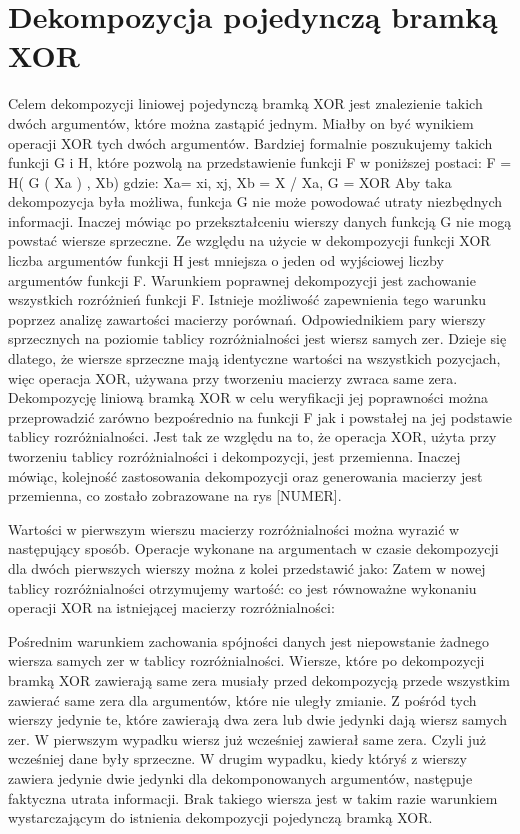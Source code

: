 \section{Dekompozycja pojedynczą bramką XOR}

Celem dekompozycji liniowej pojedynczą bramką XOR jest znalezienie takich dwóch argumentów, które można zastąpić jednym.
Miałby on być wynikiem operacji XOR tych dwóch argumentów.
Bardziej formalnie poszukujemy takich funkcji G i H, które pozwolą na przedstawienie funkcji F w poniższej postaci:
F = H( G ( Xa ) , Xb)
gdzie: Xa= {xi, xj}, Xb = X / Xa, G = XOR
Aby taka dekompozycja była możliwa, funkcja G nie może powodować utraty niezbędnych informacji.
Inaczej mówiąc po przekształceniu wierszy danych funkcją G nie mogą powstać wiersze sprzeczne.
Ze względu na użycie w dekompozycji funkcji XOR liczba argumentów funkcji H jest mniejsza o jeden od wyjściowej liczby argumentów funkcji F.
	Warunkiem poprawnej dekompozycji jest zachowanie wszystkich rozróżnień funkcji F.
Istnieje możliwość zapewnienia tego warunku poprzez analizę zawartości macierzy porównań.
Odpowiednikiem pary wierszy sprzecznych na poziomie tablicy rozróżnialności jest wiersz samych zer.
Dzieje się dlatego, że wiersze sprzeczne mają identyczne wartości na wszystkich pozycjach, więc operacja XOR, używana przy tworzeniu macierzy zwraca same zera.
	Dekompozycję liniową bramką XOR w celu weryfikacji jej poprawności można przeprowadzić zarówno bezpośrednio na funkcji F jak i powstałej na jej podstawie tablicy rozróżnialności.
Jest tak ze względu na to, że operacja XOR, użyta przy tworzeniu tablicy rozróżnialności i dekompozycji, jest przemienna.
Inaczej mówiąc, kolejność zastosowania dekompozycji oraz generowania macierzy jest przemienna, co zostało zobrazowane na rys [NUMER].



Wartości w pierwszym wierszu macierzy rozróżnialności można wyrazić w następujący sposób.
Operacje wykonane na argumentach w czasie dekompozycji dla dwóch pierwszych wierszy można z kolei przedstawić jako:
Zatem w nowej tablicy rozróżnialności otrzymujemy wartość:
 co jest równoważne wykonaniu operacji XOR na istniejącej macierzy rozróżnialności:

Pośrednim warunkiem zachowania spójności danych jest niepowstanie żadnego wiersza samych zer w tablicy rozróżnialności.
Wiersze, które po dekompozycji bramką XOR zawierają same zera musiały przed dekompozycją przede wszystkim zawierać same zera dla argumentów, które nie uległy zmianie.
Z pośród tych wierszy jedynie te, które zawierają dwa zera lub dwie jedynki dają wiersz samych zer.
W pierwszym wypadku wiersz już wcześniej zawierał same zera.
Czyli już wcześniej dane były sprzeczne.
W drugim wypadku, kiedy któryś z wierszy zawiera jedynie dwie jedynki dla dekomponowanych argumentów, następuje faktyczna utrata informacji.
Brak takiego wiersza jest w takim razie warunkiem wystarczającym do istnienia dekompozycji pojedynczą bramką XOR.

